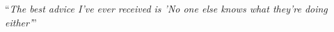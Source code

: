 \documentclass[
11pt, %
english, %
singlespacing, %
headsepline, %
]{MastersDoctoralThesis} %
\begin{document}


 
 



\vspace*{0.2\textheight}

\noindent\enquote{\itshape The best advice I've ever received is 'No one else knows what they're doing either'}\bigbreak
\end{document}

